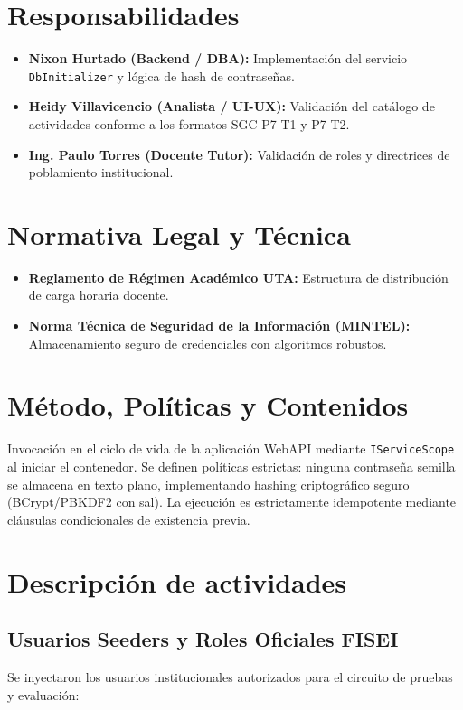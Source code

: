 \documentclass[12pt,a4paper]{article}
\begin{document}
\section{Responsabilidades}
\begin{itemize}[leftmargin=1.5em, itemsep=2pt, topsep=2pt]
    \item \textbf{Nixon Hurtado (Backend / DBA):} Implementación del servicio \texttt{DbInitializer} y lógica de hash de contraseñas.
    \item \textbf{Heidy Villavicencio (Analista / UI-UX):} Validación del catálogo de actividades conforme a los formatos SGC P7-T1 y P7-T2.
    \item \textbf{Ing. Paulo Torres (Docente Tutor):} Validación de roles y directrices de poblamiento institucional.
\end{itemize}

\section{Normativa Legal y Técnica}
\begin{itemize}[leftmargin=1.5em, itemsep=2pt, topsep=2pt]
    \item \textbf{Reglamento de Régimen Académico UTA:} Estructura de distribución de carga horaria docente.
    \item \textbf{Norma Técnica de Seguridad de la Información (MINTEL):} Almacenamiento seguro de credenciales con algoritmos robustos.
\end{itemize}

\section{Método, Políticas y Contenidos}
Invocación en el ciclo de vida de la aplicación WebAPI mediante \texttt{IServiceScope} al iniciar el contenedor. Se definen políticas estrictas: ninguna contraseña semilla se almacena en texto plano, implementando hashing criptográfico seguro (BCrypt/PBKDF2 con sal). La ejecución es estrictamente idempotente mediante cláusulas condicionales de existencia previa.

\section{Descripción de actividades}

\subsection{Usuarios Seeders y Roles Oficiales FISEI}
Se inyectaron los usuarios institucionales autorizados para el circuito de pruebas y evaluación:
\end{document}
